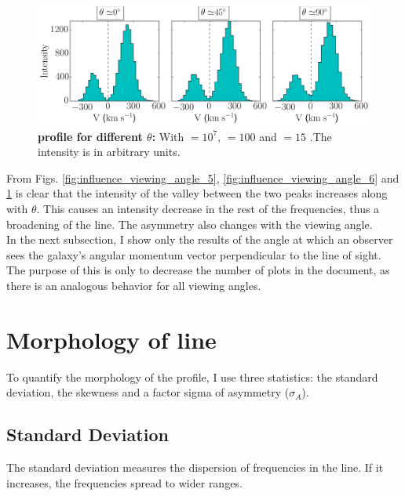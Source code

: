 \begin{figure}[h!]
	\begin{center}
		\includegraphics[width=1\textwidth]{./figures/chapter3/influence_viewing_angle_7}
	\end{center}
	\caption{\textbf{\lya profile for different $\theta$:} With \tauh$=10^7$, \vrot$=100$ \kms and \vout$=15$ \kms.The intensity is in arbitrary units.
		\label{fig:influence_viewing_angle_7}}
\end{figure}

From Figs. \ref{fig:influence_viewing_angle_5}, \ref{fig:influence_viewing_angle_6} and \ref{fig:influence_viewing_angle_7} is clear that the intensity of the valley between the two peaks increases along with $\theta$. This causes an intensity decrease in the rest of the frequencies, thus a broadening of the line. The asymmetry also changes with the viewing angle.\\

In the next subsection, I show only the results of the angle at which an observer sees the galaxy's angular momentum vector perpendicular to the line of sight. The purpose of this is only to decrease the number of plots in the document, as there is an analogous behavior for all viewing angles. \\

\section{Morphology of \lya line}
To quantify the morphology of the \lya profile, I use three statistics: the standard deviation, the skewness and a factor sigma of asymmetry ($\sigma_A$). \\

\subsection{Standard Deviation}
The standard deviation measures the dispersion of frequencies in the \lya line. If it increases, the frequencies spread to wider ranges. \\

